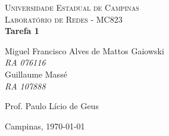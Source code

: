 \begin{titlepage}

\newcommand{\HRule}{\rule{\linewidth}{0.5mm}} 
 
\begin{center}
 

\textsc{\LARGE Universidade Estadual de Campinas}\\[0.5cm]
\textsc{\Large Laboratório de Redes - MC823}
{\ }\\[4.5cm]
 
{ \huge \bfseries Tarefa 1}\\[3.0cm]
 
\begin{flushright}
Miguel Francisco Alves de Mattos Gaiowski \\
\emph{RA 076116} \\
Guillaume Massé\\
\emph{RA 107888} \\[2.0cm]


\end{flushright}


\begin{flushright}
Prof. Paulo Lício de Geus \\
\end{flushright}
 
\vfill
 
{\large Campinas, \today}
 
\end{center}
 
\end{titlepage}
